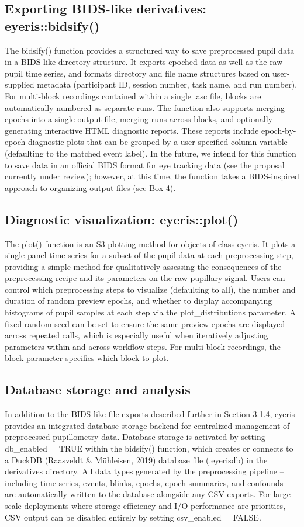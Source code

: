 \subsection{Exporting BIDS-like derivatives: eyeris::bidsify()}
The bidsify() function provides a structured way to save preprocessed pupil data in a BIDS-like directory structure. It exports epoched data as well as the raw pupil time series, and formats directory and file name structures based on user-supplied metadata (participant ID, session number, task name, and run number). For multi-block recordings contained within a single .asc file, blocks are automatically numbered as separate runs. The function also supports merging epochs into a single output file, merging runs across blocks, and optionally generating interactive HTML diagnostic reports. These reports include epoch-by-epoch diagnostic plots that can be grouped by a user-specified column variable (defaulting to the matched event label). In the future, we intend for this function to save data in an official BIDS format for eye tracking data (see the proposal currently under review); however, at this time, the function takes a BIDS-inspired approach to organizing output files (see 
Box 4).

\subsection{Diagnostic visualization: eyeris::plot()}
The plot() function is an S3 plotting method for objects of class eyeris. It plots a single-panel time series for a subset of the pupil data at each preprocessing step, providing a simple method for qualitatively assessing the consequences of the preprocessing recipe and its parameters on the raw pupillary signal. Users can control which preprocessing steps to visualize (defaulting to all), the number and duration of random preview epochs, and whether to display accompanying histograms of pupil samples at each step via the plot\_distributions parameter. A fixed random seed can be set to ensure the same preview epochs are displayed across repeated calls, which is especially useful when iteratively adjusting parameters within and across workflow steps. For multi-block recordings, the block parameter specifies which block to plot.

\subsection{Database storage and analysis}
In addition to the BIDS-like file exports described further in Section 3.1.4, eyeris provides an integrated database storage backend for centralized management of preprocessed pupillometry data. Database storage is activated by setting db\_enabled = TRUE within the bidsify() function, which creates or connects to a DuckDB (Raasveldt \& Mühleisen, 2019) database file (.eyerisdb) in the derivatives directory. All data types generated by the preprocessing pipeline – including time series, events, blinks, epochs, epoch summaries, and confounds – are automatically written to the database alongside any CSV exports. For large-scale deployments where storage efficiency and I/O performance are priorities, CSV output can be disabled entirely by setting csv\_enabled = FALSE.

